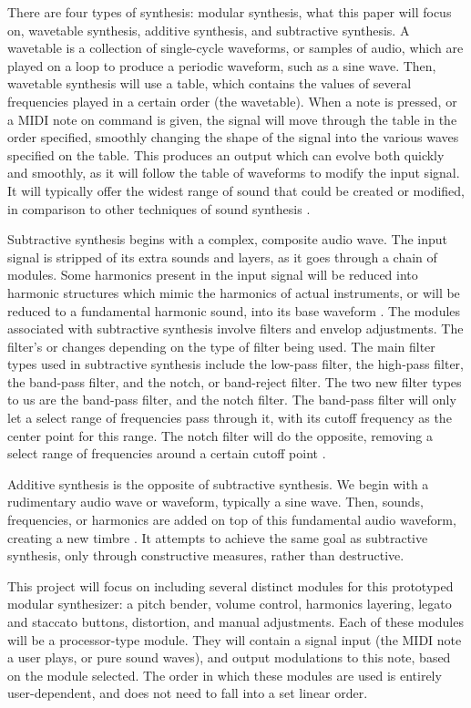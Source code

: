 There are four types of synthesis: modular synthesis, what this paper will focus on, wavetable synthesis, additive synthesis, and subtractive synthesis. A wavetable is a collection of single-cycle waveforms, or samples of audio, which are played on a loop to produce a periodic waveform, such as a sine wave. Then, wavetable synthesis will use a table, which contains the values of several frequencies played in a certain order (the wavetable). When a note is pressed, or a MIDI note on command is given, the signal will move through the table in the order specified, smoothly changing the shape of the signal into the various waves specified on the table. This produces an output which can evolve both quickly and smoothly, as it will follow the table of waveforms to modify the input signal. It will typically offer the widest range of sound that could be created or modified, in comparison to other techniques of sound synthesis \cite{Gabrielli_2020}.

Subtractive synthesis begins with a complex, composite audio wave. The input signal is stripped of its extra sounds and layers, as it goes through a chain of modules. Some harmonics present in the input signal will be reduced into harmonic structures which mimic the harmonics of actual instruments, or will be reduced to a fundamental harmonic sound, into its base waveform \cite{Gabrielli_2020}. The modules associated with subtractive synthesis involve filters and envelop adjustments. The filter's  or  changes depending on the type of filter being used. The main filter types used in subtractive synthesis include the low-pass filter, the high-pass filter, the band-pass filter, and the notch, or band-reject filter. The two new filter types to us are the band-pass filter, and the notch filter. The band-pass filter will only let a select range of frequencies pass through it, with its cutoff frequency as the center point for this range. The notch filter will do the opposite, removing a select range of frequencies around a certain cutoff point \cite{Gabrielli_2020}.

Additive synthesis is the opposite of subtractive synthesis. We begin with a rudimentary audio wave or waveform, typically a sine wave. Then, sounds, frequencies, or harmonics are added on top of this fundamental audio waveform, creating a new timbre \cite{Winer_2018}. It attempts to achieve the same goal as subtractive synthesis, only through constructive measures, rather than destructive. 

This project will focus on including several distinct modules for this prototyped modular synthesizer: a pitch bender, volume control, harmonics layering, legato and staccato buttons, distortion, and manual adjustments. Each of these modules will be a processor-type module. They will contain a signal input (the MIDI note a user plays, or pure sound waves), and output modulations to this note, based on the module selected. The order in which these modules are used is entirely user-dependent, and does not need to fall into a set linear order. 